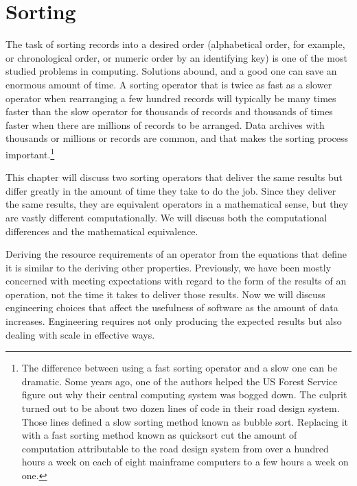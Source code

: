 \chapter{Sorting}
\label{ch:sorting}

The task of sorting records into a desired order
(alphabetical order, for example, or chronological order,
or numeric order by an identifying key)
is one of the most studied problems in computing.
Solutions abound,
and a good one can save an enormous amount of time.
A sorting operator that is twice as fast
as a slower operator when rearranging a few hundred records
will typically be many times faster than the slow operator
for thousands of records and thousands of times faster
when there are millions of records to be arranged.
Data archives with thousands or millions or records
are common, and that makes the sorting process important.\footnote{The
difference between using a fast sorting operator and a slow one
can be dramatic.
\label{bubble-vs-quicksort-example}
Some years ago, one of the authors helped the US Forest Service
figure out why their central computing system
was bogged down.
The culprit turned out to be about two dozen lines
of code in their road design system.
Those lines defined a slow sorting method
known as bubble sort. Replacing it with a fast sorting
method known as quicksort cut the amount of computation
attributable to the road design system from over a hundred
hours a week on each of eight mainframe computers to a few hours
a week on one.}

This chapter will discuss two sorting operators that
deliver the same results but differ
greatly in the amount of time they take to do the job.
Since they deliver the same results,
they are equivalent operators in a mathematical sense,
but they are vastly different computationally.
We will discuss both the computational differences
and the 
mathematical equivalence.

Deriving the resource requirements of an operator from
the equations that define it is
similar to the deriving other properties.
Previously, we have been mostly concerned with meeting
expectations with regard to the form of the results
of an operation, not the time it takes to deliver those results.
Now we will discuss engineering choices that affect the usefulness of
software as the amount of data increases.
Engineering requires not only producing the expected
results but also dealing with scale in effective ways.

